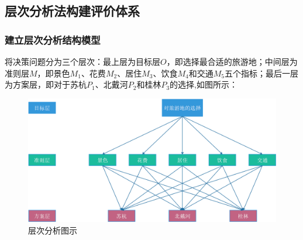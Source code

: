 \documentclass[a4paper]{article}
\begin{document}
    \subsection{层次分析法构建评价体系}

    \subsubsection{建立层次分析结构模型}
    将决策问题分为三个层次：最上层为目标层$O$，即选择最合适的旅游地；中间层为准则层$M$，即景色$M_{1}$、花费$M_{2}$、居住$M_{3}$、饮食$M_{4}$和交通$M_{5}$五个指标；最后一层为方案层，即对于苏杭$P_{1}$、北戴河$P_{2}$和桂林$P_{3}$的选择,如图所示：
    \begin{figure}[H]
    \centering
    \includegraphics[width=0.8\linewidth]{fig/AHP}
    \caption{层次分析图示}
    \label{fig:ahp}
    \end{figure}
\end{document}
